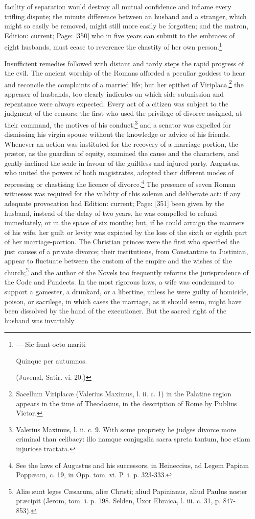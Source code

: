 facility of separation would destroy all mutual confidence and inflame every trifling dispute; the minute difference between an husband and a stranger, which might so easily be removed, might still more easily be forgotten; and the matron, Edition: current; Page: [350] who in five years can submit to the embraces of eight husbands, must cease to reverence the chastity of her own person.\footnote{\texthebrew{—} Sic fiunt octo mariti

Quinque per autumnos.

(Juvenal, Satir. vi. 20.)}

Insufficient remedies followed with distant and tardy steps the rapid progress of the evil. The ancient worship of the Romans afforded a peculiar goddess to hear and reconcile the complaints of a married life; but her epithet of Viriplaca,\footnote{Sacellum Viriplacæ (Valerius Maximus, l. ii. c. 1) in the Palatine region appears in the time of Theodosius, in the description of Rome by Publius Victor.} the appeaser of husbands, too clearly indicates on which side submission and repentance were always expected. Every act of a citizen was subject to the judgment of the censors; the first who used the privilege of divorce assigned, at their command, the motives of his conduct;\footnote{Valerius Maximus, l. ii. c. 9. With some propriety he judges divorce more criminal than celibacy: illo namque conjugalia sacra spreta tantum, hoc etiam injuriose tractata.} and a senator was expelled for dismissing his virgin spouse without the knowledge or advice of his friends. Whenever an action was instituted for the recovery of a marriage-portion, the prætor, as the guardian of equity, examined the cause and the characters, and gently inclined the scale in favour of the guiltless and injured party. Augustus, who united the powers of both magistrates, adopted their different modes of repressing or chastising the licence of divorce.\footnote{See the laws of Augustus and his successors, in Heineccius, ad Legem Papiam Poppæam, c. 19, in Opp. tom. vi. P. i. p. 323-333.} The presence of seven Roman witnesses was required for the validity of this solemn and deliberate act: if any adequate provocation had Edition: current; Page: [351] been given by the husband, instead of the delay of two years, he was compelled to refund immediately, or in the space of six months; but, if he could arraign the manners of his wife, her guilt or levity was expiated by the loss of the sixth or eighth part of her marriage-portion. The Christian princes were the first who specified the just causes of a private divorce; their institutions, from Constantine to Justinian, appear to fluctuate between the custom of the empire and the wishes of the church;\footnote{Aliæ sunt leges Cæsarum, aliæ Christi; aliud Papinianus, aliud Paulus noster præcipit (Jerom, tom. i. p. 198. Selden, Uxor Ebraica, l. iii. c. 31, p. 847-853).} and the author of the Novels too frequently reforms the jurisprudence of the Code and Pandects. In the most rigorous laws, a wife was condemned to support a gamester, a drunkard, or a libertine, unless he were guilty of homicide, poison, or sacrilege, in which cases the marriage, as it should seem, might have been dissolved by the hand of the executioner. But the sacred right of the husband was invariably 